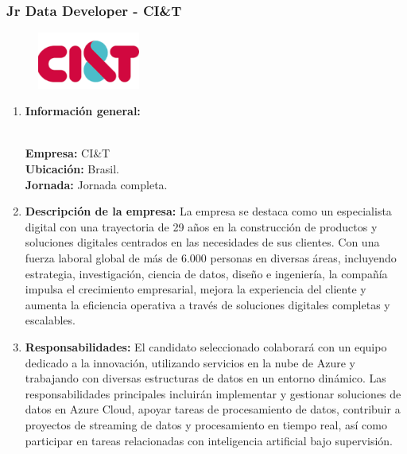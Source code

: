 \documentclass[12pt]{article}
\begin{document}
            \subsubsection{Jr Data Developer -  CI\&T}

                \begin{figure}[!h]
                    \centering
                    \includegraphics[width=0.3\textwidth]{Recursos/Img/citLogo.png}
                \end{figure}

                \begin{enumerate}
                    \item \textbf{Información general:}
                    
                        \textbf{\\Empresa:} CI\&T
                        \textbf{\\Ubicación:} Brasil.
                        \textbf{\\Jornada:} Jornada completa.

                    \item \textbf{Descripción de la empresa:} 
                        La empresa se destaca como un especialista digital con una trayectoria de 29 años en la construcción de productos y soluciones digitales centrados en las necesidades de sus clientes. Con una fuerza laboral global de más de 6.000 personas en diversas áreas, incluyendo estrategia, investigación, ciencia de datos, diseño e ingeniería, la compañía impulsa el crecimiento empresarial, mejora la experiencia del cliente y aumenta la eficiencia operativa a través de soluciones digitales completas y escalables.

                    \item \textbf{Responsabilidades:}
                        El candidato seleccionado colaborará con un equipo dedicado a la innovación, utilizando servicios en la nube de Azure y trabajando con diversas estructuras de datos en un entorno dinámico. Las responsabilidades principales incluirán implementar y gestionar soluciones de datos en Azure Cloud, apoyar tareas de procesamiento de datos, contribuir a proyectos de streaming de datos y procesamiento en tiempo real, así como participar en tareas relacionadas con inteligencia artificial bajo supervisión.


\end{enumerate}
\end{document}
